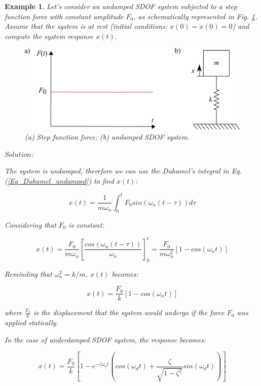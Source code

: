 \documentclass[12pt,letter]{article}
\newtheorem{ex}{Example}
\numberwithin{ex}{section} %
\newenvironment{example}{\begin{mdframed}[middlelinewidth=0.5mm]\begin{ex}\normalfont}{\end{ex}\end{mdframed}}
\numberwithin{re}{section} %
\begin{document}
\begin{example}
	
	Let's consider an undamped SDOF system subjected to a step function force with constant amplitude $F_0$, as schematically represented in Fig. \ref{fig:step_force}. Assume that the system is at rest (initial conditions: $x(0) = \dot{x}(0) = 0$) and compute the system response $x(t)$. 
	
	\begin{figure}[H]
		\centering
		\includegraphics{../figures/structural_step_function_example.png}
		\caption{(a) Step function force; (b) undamped SDOF system.}
		\label{fig:step_force}
	\end{figure}

\vspace{1ex}
	
\noindent $Solution$:
	
\vspace{1ex}
	
The system is undamped, therefore we can use the Duhamel's integral in Eq. (\ref{Eq_Duhamel_undamped}) to find $x(t)$:

\begin{equation} 
x(t) = \frac{1}{m \omega_n} \int_{0}^{t} F_0 sin(\omega_n (t - \tau)) d\tau 
\end{equation}

Considering that $F_0$ is constant:

\begin{equation}
x(t) = \frac{F_0}{m \omega_n} \left [\frac{cos(\omega_n (t - \tau))}{\omega_n} \right ]_{0}^t = \frac{F_0}{m \omega_n^2} [1 - cos(\omega_n t)]
\end{equation}

Reminding that $\omega_n^2 = k/m$, $x(t)$ becomes:

\begin{equation}
x(t) = \frac{F_0}{k} [1 - cos(\omega_n t)]
\end{equation}

where $\frac{F_0}{k}$ is the displacement that the system would undergo if the force $F_0$ was applied statically.

In the case of underdamped SDOF system, the response becomes:

\begin{equation} 
x(t) = \frac{F_0}{k} \left [1 - e^{-\zeta \omega_n t} \left (cos(\omega_d t) + \frac{\zeta}{\sqrt{1 - \zeta^2}} sin(\omega_d t)\right) \right]
\end{equation}

\end{example}
\end{document}
